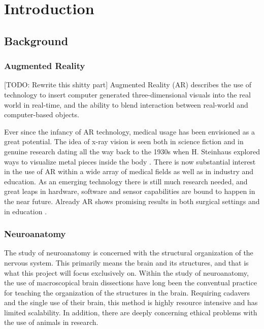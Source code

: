 \chapter{Introduction}

\section{Background}

\subsection*{Augmented Reality}
{
    \color{BrickRed}
    [TODO: Rewrite this shitty part]
    Augmented Reality (AR) describes the use of technology to insert computer generated three-dimensional visuals into the real world in real-time, and the ability to blend interaction between real-world and computer-based objects. 
}

\noindent Ever since the infancy of AR technology, medical usage has been envisioned as a great potential. The idea of x-ray vision is seen both in science fiction and in genuine research dating all the way back to the 1930s when H. Steinhaus explored ways to visualize metal pieces inside the body \citep{Sielhorst2008}. There is now substantial interest in the use of AR within a wide array of medical fields as well as in industry and education. As an emerging technology there is still much research needed, and great leaps in hardware, software and sensor capabilities are bound to happen in the near future. Already AR shows promising results in both surgical settings and in education \citep{Singh2013}.

\subsection*{Neuroanatomy}

The study of neuroanatomy is concerned with the structural organization of the nervous system. This primarily means the brain and its structures, and that is what this project will focus exclusively on.
Within the study of neuroanatomy, the use of macroscopical brain dissections have long been the conventual practice for teaching the organization of the structures in the brain. Requiring cadavers and the single use of their brain, this method is highly resource intensive and has limited scalability. In addition, there are deeply concerning ethical problems with the use of animals in research. 

